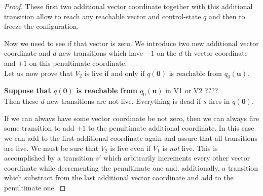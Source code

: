 \begin{proof}
These first two additional vector coordinate together with this additional transition allow
to reach any reachable vector and control-state $q$ and then to freeze the configuration.


Now we need to see if that vector is zero.
We introduce two new additional vector coordinate and $d$ new transitions which have
$-1$ on the $d$-th vector coordinate and $+1$ on this penultimate coordinate. \\


Let us now prove that $V_2$ is live if and only if 
$q(\textbf{0})$
is reachable from $q_0(\textbf{u})$.

{\bf Suppose that $q(\textbf{0})$ is reachable from $q_0(\textbf{u})$} in V1 or V2 ????\\
Then these  $d$ new transitions are not live. Everything  is dead if $s$ fires in $q(\textbf{0})$.


If we can always have some vector coordinate be not zero, then we can always fire some transition to add $+1$ to the penultimate additional coordinate.
In this case we can add to the first additional coordinate again and assure that all transitions are live.
We must be sure that $V_2$ is live even if $V_1$ is {\em not} live.
This is accomplished by a transition $s'$ which arbitrarily increments every other vector coordinate 
while decrementing the penultimate one and, additionally, a transition which 
substract from the last additional vector coordinate and add to the penultimate one. 


\end{proof}
